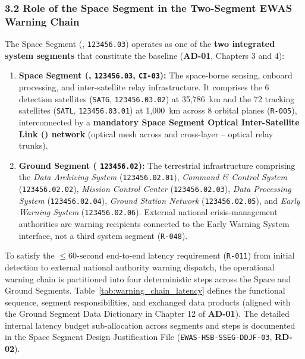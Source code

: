 \begin{enumerate}
\begin{itemize}
    \end{itemize}
\end{enumerate}

\subsubsection{3.2 Role of the Space Segment in the Two-Segment EWAS Warning Chain}

The Space Segment (,  \texttt{123456.03}) operates as one of the \textbf{two integrated system segments} that constitute the  baseline (\textbf{AD-01}, Chapters 3 and 4):
\begin{enumerate}
    \item \textbf{Space Segment (,  \texttt{123456.03}, \texttt{CI-03}):} The space-borne sensing, onboard processing, and inter-satellite relay infrastructure. It comprises the 6  detection satellites (\texttt{SATG},  \texttt{123456.03.02}) at 35,786~km and the 72  tracking satellites (\texttt{SATL},  \texttt{123456.03.01}) at 1,000~km across 8 orbital planes (\texttt{R-005}), interconnected by a \textbf{mandatory Space Segment Optical Inter-Satellite Link () network} (optical mesh across  and cross-layer -- optical relay trunks).
    \item \textbf{Ground Segment ( \texttt{123456.02}):} The terrestrial infrastructure comprising the \emph{Data Archiving System} (\texttt{123456.02.01}), \emph{Command \& Control System} (\texttt{123456.02.02}), \emph{Mission Control Center} (\texttt{123456.02.03}), \emph{Data Processing System} (\texttt{123456.02.04}), \emph{Ground Station Network} (\texttt{123456.02.05}), and \emph{Early Warning System} (\texttt{123456.02.06}). External national crisis-management authorities are warning recipients connected to the Early Warning System interface, not a third system segment (\texttt{R-048}).
\end{enumerate}

To satisfy the $\le 60\text{-second}$ end-to-end latency requirement (\texttt{R-011}) from initial  detection to external national authority warning dispatch, the operational warning chain is partitioned into four deterministic steps across the Space and Ground Segments. Table~\ref{tab:warning_chain_latency} defines the functional sequence, segment responsibilities, and exchanged data products (aligned with the Ground Segment Data Dictionary in Chapter 12 of \textbf{AD-01}). The detailed internal latency budget sub-allocation across segments and steps is documented in the Space Segment Design Justification File (\texttt{EWAS-HSB-SSEG-DDJF-03}, \textbf{RD-02}).

